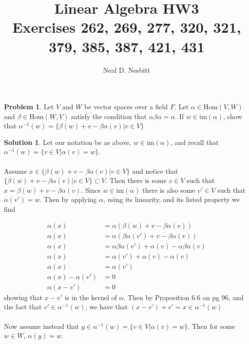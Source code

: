 \documentclass{article}
\title{Linear Algebra HW3\\
Exercises 262, 269, 277, 320, 321, 379, 385, 387, 421, 431}
\author{Neal D. Nesbitt}
\begin{document}
\maketitle

\theoremstyle{definition}
\newtheorem{problem}{Problem}[section]
\newtheorem{solution}{Solution}[problem]
\renewcommand{\thesolution}{\theproblem}

\setcounter{section}{6}
\setcounter{problem}{261}
\begin{problem}
Let $V$ and $W$ be vector spaces over a field $F$. Let $\alpha \in \text{Hom}(V,W)$ and $\beta \in \text{Hom}(W,V)$ satisfy the condition that $\alpha\beta\alpha = \alpha$. If $w \in \text{im}(\alpha)$, show that $\alpha^{-1}(w) = \{ \beta(w) +v -\beta\alpha(v) \vert v \in V \}$
\end{problem}

\begin{solution}
Let our notation be as above, $w \in \text{im}(\alpha)$, and recall that $\alpha^{-1}(w) = \{ v \in V \vert \alpha(v) = w \}$.

\paragraph{}
Assume $x \in \{ \beta(w) +v -\beta\alpha(v) \vert v \in V \}$ and notice that $\{ \beta(w) +v -\beta\alpha(v) \vert v \in V \} \subset V$. Then there is some $v \in V$ such that $x = \beta(w) +v -\beta\alpha(v)$. Since $w\in\text{im}(\alpha)$ there is also some $v\prime \in V$ such that $\alpha(v\prime) = w$. Then by applying $\alpha$, using its linearity, and its listed property we find

\begin{align*}
\alpha(x) &= \alpha(\beta(w) +v -\beta\alpha(v))\\
\alpha(x) &= \alpha(\beta\alpha(v\prime) +v -\beta\alpha(v))\\
\alpha(x) &= \alpha\beta\alpha(v\prime) +\alpha(v) -\alpha\beta\alpha(v)\\
\alpha(x) &= \alpha(v\prime) +\alpha(v) -\alpha(v)\\
\alpha(x) &= \alpha(v\prime)\\
\alpha(x) -\alpha(v\prime) &= 0\\
\alpha(x -v\prime) &= 0
\end{align*}
showing that $x -v\prime$ is in the kernel of $\alpha$. Then by Proposition 6.6 on pg 96, and the fact that $v\prime \in \alpha^{-1}(w)$, we have that $(x -v\prime) +v\prime = x \in \alpha^{-1}(w)$

\paragraph{}
Now assume instead that $y \in \alpha^{-1}(w) = \{ v \in V \vert \alpha(v) = w \}$. Then for some $w \in W$, $\alpha(y) = w$.

\end{solution}
\end{document}
